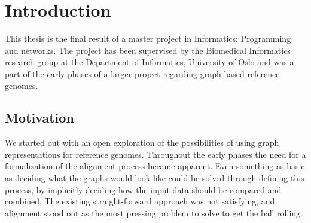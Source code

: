 \documentclass[thesis.tex]{subfiles}
\begin{document}
\chapter{Introduction}
This thesis is the final result of a master project in Informatics: Programming and networks. The project has been supervised by the Biomedical Informatics research group at the Department of Informatics, University of Oslo and was a part of the early phases of a larger project regarding graph-based reference genomes.
\section{Motivation}
We started out with an open exploration of the possibilities of using graph representations for reference genomes. Throughout the early phases the need for a formalization of the alignment process became apparent. Even something as basic as deciding what the graphs would look like could be solved through defining this process, by implicitly deciding how the input data should be compared and combined. The existing straight-forward approach was not satisfying, and alignment stood out as the most pressing problem to solve to get the ball rolling. 
\end{document}
